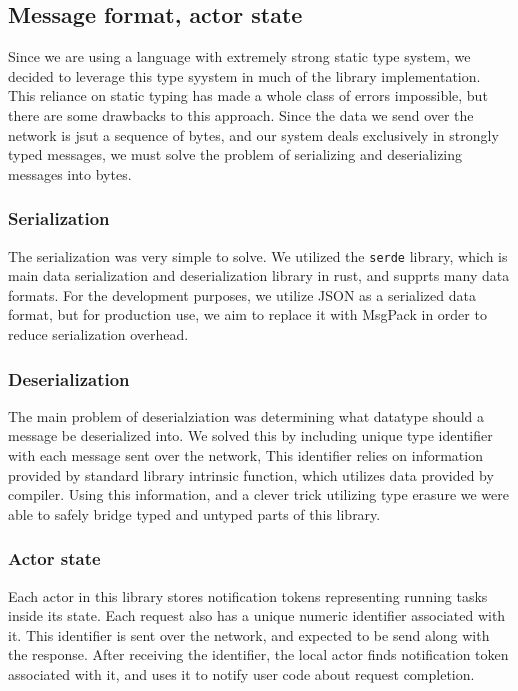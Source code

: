 \subsection{Message format, actor state}
Since we are using a language with extremely strong static type system, we decided to leverage this type syystem in much
of the library implementation. This reliance on static typing has made a whole class of errors impossible, but there
are some drawbacks to this approach. Since the data we send over the network is jsut a sequence of bytes, and our system
deals exclusively in strongly typed messages, we must solve the problem of serializing and deserializing messages into bytes.

\subsubsection{Serialization}
The serialization was very simple to solve. We utilized the \verb|serde| library, which is main data serialization and deserialization
library in rust, and supprts many data formats. For the development purposes, we utilize JSON as a serialized data format,
but for production use, we aim to replace it with MsgPack in order to reduce serialization overhead.

\subsubsection{Deserialization}
The main problem of deserialziation was determining what datatype should a message be deserialized into.
We solved this by including unique type identifier with each message sent over the network, This identifier relies
on information provided by standard library intrinsic function, which utilizes data provided by compiler.
Using this information, and a clever trick utilizing type erasure we were able to safely bridge typed and untyped
parts of this library.

\subsubsection{Actor state}
Each actor in this library stores notification tokens representing running tasks inside its state. Each request also
has a unique numeric identifier associated with it. This identifier is sent over the network, and expected to be
send along with the response. After receiving the identifier, the local actor finds notification token associated
with it, and uses it to notify user code about request completion.

